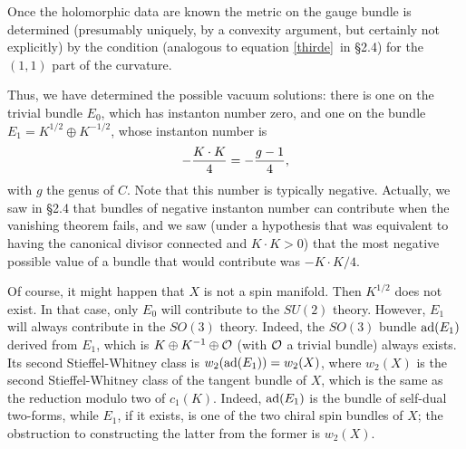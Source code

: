\documentclass[12pt]{article}
\numberwithin{equation}{section}
\begin{document}
Once the holomorphic data are known
the metric on the gauge bundle is determined (presumably uniquely,
by a convexity argument, but certainly not explicitly) by the condition
(analogous to equation \eqref{thirde}\ in \S2.4) for the $(1,1)$ part of
the curvature.

Thus, we have determined the
possible vacuum solutions: there is one on the trivial bundle $E_0$, which
has instanton number zero,
and one on the bundle $E_1=K^{1/2}\oplus K^{-1/2}$, whose instanton number is
\begin{equation}
  \label{rufn}
  -{K\cdot K\over 4}= -{g-1\over 4},
\end{equation}
with $g$ the genus of $C$.  Note that this number is typically
negative.
Actually, we saw in  \S2.4 that bundles of negative instanton number
can contribute when the vanishing theorem fails, and we saw
(under a hypothesis that was
  equivalent to having the canonical divisor connected
and $K\cdot K>0$) that the most negative possible value of a bundle
that would contribute was $-K\cdot K/4$.

Of course, it might happen that $X$ is not a spin manifold.  Then
$K^{1/2}$ does not exist.  In that case, only $E_0$ will contribute
to the $SU(2)$ theory.  However, $E_1$ will always contribute in the
$SO(3)$ theory.  Indeed, the $SO(3)$ bundle ${\rm ad}(E_1)$
derived from $E_1$,
which is $K\oplus K^{-1}\oplus {\cal O}$ (with ${\cal O}$ a trivial
bundle) always exists.
Its second Stieffel-Whitney class is $w_2({\rm ad}(E_1))=w_2(X)$,
where $w_2(X)$ is the second Stieffel-Whitney class of the tangent
bundle of $X$, which is the same as the reduction modulo two of $c_1(K)$.
Indeed, ${\rm ad}(E_1)$ is the bundle of self-dual two-forms, while
$E_1$, if it exists, is one of the two chiral spin bundles of $X$;
the obstruction to constructing the latter from the former is $w_2(X)$.

\bigskip
{}
\end{document}

